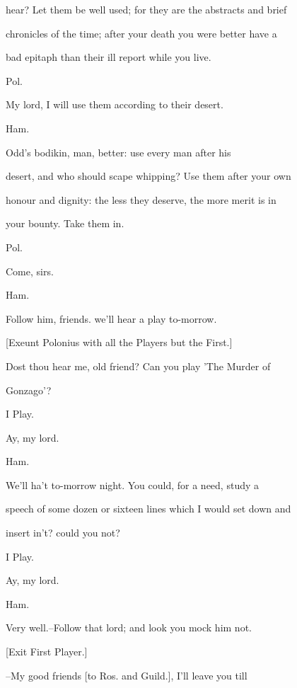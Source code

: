\documentclass[12pt]{book}
\begin{document}
hear? Let them be well used; for they are the abstracts and brief

chronicles of the time; after your death you were better have a

bad epitaph than their ill report while you live.



Pol.

My lord, I will use them according to their desert.



Ham.

Odd's bodikin, man, better: use every man after his

desert, and who should scape whipping? Use them after your own

honour and dignity: the less they deserve, the more merit is in

your bounty. Take them in.



Pol.

Come, sirs.



Ham.

Follow him, friends. we'll hear a play to-morrow.



[Exeunt Polonius with all the Players but the First.]



Dost thou hear me, old friend? Can you play 'The Murder of

Gonzago'?



I Play.

Ay, my lord.



Ham.

We'll ha't to-morrow night. You could, for a need, study a

speech of some dozen or sixteen lines which I would set down and

insert in't? could you not?



I Play.

Ay, my lord.



Ham.

Very well.--Follow that lord; and look you mock him not.



[Exit First Player.]



--My good friends [to Ros. and Guild.], I'll leave you till
\end{document}
